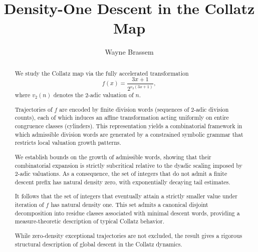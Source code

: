 \documentclass[12pt, oneside]{article}   	%
\title{Density-One Descent in the Collatz Map}
\author{Wayne Brassem}
\numberwithin{equation}{section}          %
\theoremstyle{definition}
\begin{document}

\NewDocumentCommand{\Rarr}{}{\textrightarrow{}}			%


\maketitle


\begin{abstract}

We study the Collatz map via the fully accelerated transformation
\[
f(x)=\frac{3x+1}{2^{v_2(3x+1)}},
\]
where $v_2(n)$ denotes the 2-adic valuation of $n$.

Trajectories of $f$ are encoded by finite division words (sequences of
2-adic division counts), each of which induces an affine transformation acting
uniformly on entire congruence classes (cylinders). This representation yields a
combinatorial framework in which admissible division words are generated by a
constrained symbolic grammar that restricts local valuation growth patterns.

We establish bounds on the growth of admissible words, showing that their
combinatorial expansion is strictly subcritical relative to the dyadic scaling
imposed by 2-adic valuations. As a consequence, the set of integers that do not
admit a finite descent prefix has natural density zero, with exponentially
decaying tail estimates.

It follows that the set of integers that eventually attain a strictly smaller
value under iteration of $f$ has natural density one. This set admits a canonical
disjoint decomposition into residue classes associated with minimal descent words,
providing a measure-theoretic description of typical Collatz behavior.

While zero-density exceptional trajectories are not excluded, the result gives a
rigorous structural description of global descent in the Collatz dynamics.

\end{abstract}
\end{document}
